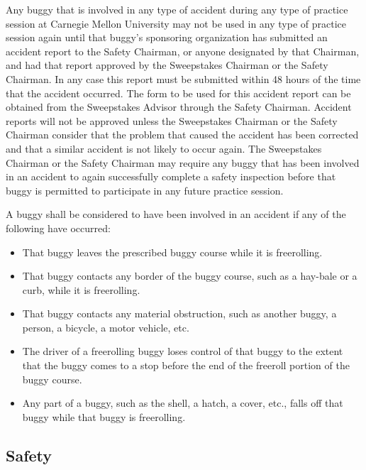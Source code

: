 	Any buggy that is involved in any type of accident during any type of practice
	session at Carnegie Mellon University may not be used in any type of practice
	session again until that buggy's sponsoring organization has submitted an
	accident report to the Safety Chairman, or anyone designated by that Chairman,
	and had that report approved by the Sweepstakes Chairman or the Safety
	Chairman. In any case this report must be submitted within 48 hours of the time
	that the accident occurred. The form to be used for this accident report can be
	obtained from the Sweepstakes Advisor through the Safety Chairman. Accident
	reports will not be approved unless the Sweepstakes Chairman or the Safety
	Chairman consider that the problem that caused the accident has been corrected
	and that a similar accident is not likely to occur again. The Sweepstakes
	Chairman or the Safety Chairman may require any buggy that has been involved in
	an accident to again successfully complete a safety inspection before that
	buggy is permitted to participate in any future practice session.

	A buggy shall be considered to have been involved in an accident if any of the
	following have occurred:

	\begin{itemize}

		\item That buggy leaves the prescribed buggy course while it is
		freerolling.

		\item That buggy contacts any border of the buggy course, such as a
		hay-bale or a curb, while it is freerolling.

		\item That buggy contacts any material obstruction, such as another buggy,
		a person, a bicycle, a motor vehicle, etc.

		\item The driver of a freerolling buggy loses control of that buggy to the
		extent that the buggy comes to a stop before the end of the freeroll portion of
		the buggy course.

		\item Any part of a buggy, such as the shell, a hatch, a cover, etc., falls
		off that buggy while that buggy is freerolling.

	\end{itemize}

\subsection{Safety}


